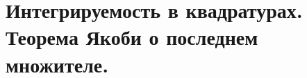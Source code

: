 \section{Интегрируемость в квадратурах. Теорема Якоби о последнем множителе.}\label{chasec11}



\newpage